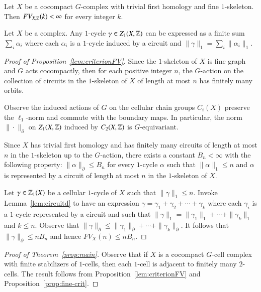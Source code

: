\begin{proposition}\label{lem:criterionFV}
Let $X$ be a cocompact $G$-complex with trivial first homology and fine $1$-skeleton. Then $FV_{X, \mathbb{Z}}(k)<\infty$ for every integer $k$.  
\end{proposition}

\begin{lemma}\cite[Lemma A2]{Ge98}\label{lem:circuitd}
Let $X$ be a complex. Any $1$-cycle $\gamma \in Z_1(X, \mathbb{Z})$ can be expressed as a finite sum $\sum_{i} \alpha_i$ where each $\alpha_i$ is a $1$-cycle induced by a circuit and $\|\gamma\|_1 = \sum_{i} \|\alpha_i\|_1$.
\end{lemma}

\begin{proof}[Proof of Proposition~\ref{lem:criterionFV}] 
 Since the $1$-skeleton of $X$ is fine graph and $G$ acts cocompactly, then for each positive integer $n$, the $G$-action on the collection of circuits in the $1$-skeleton of $X$ of length at most $n$ has finitely many orbits. 

Observe the induced actions of $G$ on the cellular chain groups $C_i(X)$ preserve the $\ell_1$-norm and commute with the boundary maps.  In particular, the norm $\|\cdot\|_\partial$ on $Z_1(X, \mathbb{Z})$ induced by $C_2(X, \mathbb{Z})$ is $G$-equivariant. 

Since $X$ has trivial first homology and has finitely many circuits of length at most $n$ in the $1$-skeleton up to the $G$-action, there exists a constant $B_n<\infty$ with the following property: $\|\alpha\|_\partial \leq B_n$ for every $1$-cycle $\alpha$ such that $\|\alpha\|_1\leq n$  and $\alpha$ is represented by a circuit of length at most $n$ in the $1$-skeleton of $X$.

Let $\gamma \in \mathbb{Z}_1(X)$ be a cellular $1$-cycle of $X$ such that $\|\gamma\|_1\leq n$. Invoke Lemma~\ref{lem:circuitd} to have an expression  $\gamma=\gamma_1+\gamma_2+\cdots+\gamma_k$ where each $\gamma_i$ is a $1$-cycle represented by a circuit and such that  $\|\gamma\|_1=\|\gamma_1\|_1+ \cdots + \|\gamma_k\|_1$ and  $k\leq n$. Observe that $\|\gamma\|_\partial \leq \|\gamma_1\|_\partial+ \cdots + \|\gamma_k\|_\partial$. It follows that $\|\gamma\|_\partial \leq nB_n$ and hence $FV_X(n) \leq n B_n$.
\end{proof}

\begin{proof}[Proof of Theorem~\ref{prop:main}]
Observe that if $X$ is a cocompact $G$-cell complex with finite stabilizers of $1$-cells, then each $1$-cell is adjacent to finitely many $2$-cells.  The result  follows  from Proposition~\ref{lem:criterionFV} and Proposition~\ref{prop:fine-crit}.  
\end{proof}

